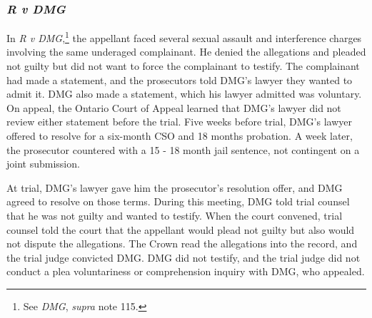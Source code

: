 \subsubsection{\textit{R v DMG}}

In \textit{R v DMG},\footnote{See \textit{DMG}, \textit{supra} note 115.} the appellant faced several sexual assault and interference charges involving the same underaged complainant. He denied the allegations and pleaded not guilty but did not want to force the complainant to testify. The complainant had made a statement, and the prosecutors told DMG's lawyer they wanted to admit it. DMG also made a statement, which his lawyer admitted was voluntary. On appeal, the Ontario Court of Appeal learned that DMG's lawyer did not review either statement before the trial. Five weeks before trial, DMG's lawyer offered to resolve for a six-month CSO and 18 months probation. A week later, the prosecutor countered with a 15 - 18 month jail sentence, not contingent on a joint submission. 

At trial, DMG's lawyer gave him the prosecutor's resolution offer, and DMG agreed to resolve on those terms. During this meeting, DMG told trial counsel that he was not guilty and wanted to testify. When the court convened, trial counsel told the court that the appellant would plead not guilty but also would not dispute the allegations. The Crown read the allegations into the record, and the trial judge convicted DMG. DMG did not testify, and the trial judge did not conduct a plea voluntariness or comprehension inquiry with DMG, who appealed.

